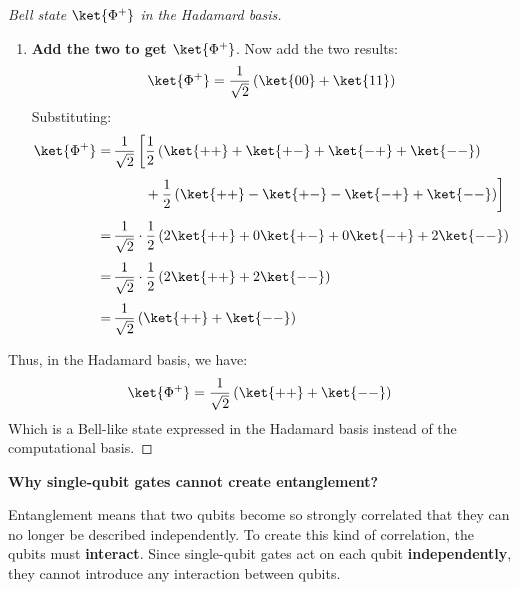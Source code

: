 \begin{examplebox}
\begin{proof}[Bell state $\ket{\Phi^{+}}$ in the Hadamard basis]
\begin{enumerate}
            \item \textbf{Add the two to get $\ket{\Phi^{+}}$}. Now add the two results:
            \begin{equation*}
                \ket{\Phi^{+}} = \dfrac{1}{\sqrt{2}}\left(\ket{00} + \ket{11}\right)
            \end{equation*}
            Substituting:
            \begin{equation*}
                \begin{aligned}
                    \ket{\Phi^{+}} =& \,\dfrac{1}{\sqrt{2}} \left[
                        \dfrac{1}{2} \left( \ket{++} + \ket{+-} + \ket{-+} + \ket{--} \right)
                    \right. \\[.3em]
                    & \left.
                    \phantom{\,\dfrac{1}{2}}\hspace{1.2em} + \dfrac{1}{2} \left(\ket{++} - \ket{+-} - \ket{-+} + \ket{--}\right)
                    \right] \\[.3em]
                    =& \,\dfrac{1}{\sqrt{2}} \cdot \dfrac{1}{2} \left( 2\ket{++} + 0\ket{+-} + 0\ket{-+} + 2\ket{--} \right) \\[.3em]
                    =& \,\dfrac{1}{\sqrt{2}} \cdot \dfrac{1}{2} \left( 2\ket{++} + 2\ket{--} \right) \\[.3em]
                    =& \,\dfrac{1}{\sqrt{2}} \left(\ket{++} + \ket{--}\right)
                \end{aligned}
            \end{equation*}
        \end{enumerate}
        Thus, in the Hadamard basis, we have:
        \begin{equation*}
            \ket{\Phi^{+}} = \dfrac{1}{\sqrt{2}}\left(\ket{++} + \ket{--}\right)
        \end{equation*}
        Which is a Bell-like state expressed in the Hadamard basis instead of the computational basis.
    \end{proof}
\end{examplebox}

\begin{flushleft}
    \textcolor{Green3}{ \textbf{Why single-qubit gates cannot create entanglement?}}
    \label{question:why-single-qubit-gates-cannot-create-entanglement}
\end{flushleft}
Entanglement means that two qubits become so strongly correlated that they can no longer be described independently. To create this kind of correlation, the qubits must \textbf{interact}. Since single-qubit gates act on each qubit \textbf{independently}, they cannot introduce any interaction between qubits.

